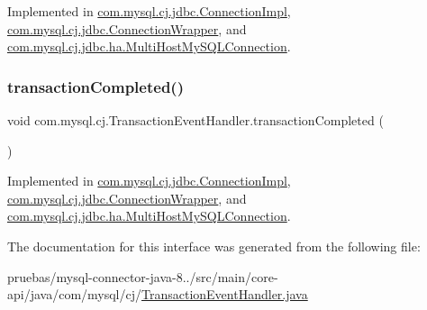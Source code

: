 Implemented in \mbox{\hyperlink{classcom_1_1mysql_1_1cj_1_1jdbc_1_1_connection_impl_a7a80d752abc5d9a9b0b3b2a3b93f6d19}{com.\+mysql.\+cj.\+jdbc.\+Connection\+Impl}}, \mbox{\hyperlink{classcom_1_1mysql_1_1cj_1_1jdbc_1_1_connection_wrapper_af1db22509d166c6582f945352746e166}{com.\+mysql.\+cj.\+jdbc.\+Connection\+Wrapper}}, and \mbox{\hyperlink{classcom_1_1mysql_1_1cj_1_1jdbc_1_1ha_1_1_multi_host_my_s_q_l_connection_a48baee82b32b4bc2f20948b1fd5f1832}{com.\+mysql.\+cj.\+jdbc.\+ha.\+Multi\+Host\+My\+S\+Q\+L\+Connection}}.

\mbox{\label{interfacecom_1_1mysql_1_1cj_1_1_transaction_event_handler_ac0775d70699a27ec6a8a7954e64b86f8}} 
\subsubsection{\texorpdfstring{transaction\+Completed()}{transactionCompleted()}}
{\footnotesize\ttfamily void com.\+mysql.\+cj.\+Transaction\+Event\+Handler.\+transaction\+Completed (\begin{DoxyParamCaption}{ }\end{DoxyParamCaption})}



Implemented in \mbox{\hyperlink{classcom_1_1mysql_1_1cj_1_1jdbc_1_1_connection_impl_a83abf159abc9bcc5cda61fb4ff15fc63}{com.\+mysql.\+cj.\+jdbc.\+Connection\+Impl}}, \mbox{\hyperlink{classcom_1_1mysql_1_1cj_1_1jdbc_1_1_connection_wrapper_a88a3cbba3f3812a1a2023075e8ecfc36}{com.\+mysql.\+cj.\+jdbc.\+Connection\+Wrapper}}, and \mbox{\hyperlink{classcom_1_1mysql_1_1cj_1_1jdbc_1_1ha_1_1_multi_host_my_s_q_l_connection_af59a5f954f0a1acc76d01d042728dc21}{com.\+mysql.\+cj.\+jdbc.\+ha.\+Multi\+Host\+My\+S\+Q\+L\+Connection}}.



The documentation for this interface was generated from the following file\+:\begin{DoxyCompactItemize}
\item 
pruebas/mysql-\/connector-\/java-\/8../src/main/core-\/api/java/com/mysql/cj/\mbox{\hyperlink{_transaction_event_handler_8java}{Transaction\+Event\+Handler.\+java}}\end{DoxyCompactItemize}
